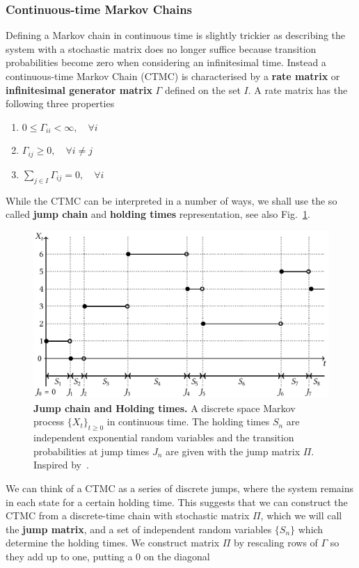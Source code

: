 \subsubsection{Continuous-time Markov Chains}
\label{subsubsect:CTMC}
Defining a Markov chain in continuous time is slightly trickier as describing the system with a stochastic matrix does no longer suffice because transition probabilities become zero when considering an infinitesimal time. Instead a continuous-time Markov Chain (CTMC) is characterised by a \textbf{rate matrix} or \textbf{infinitesimal generator matrix} $\Gamma$ defined on the set $I$. A rate matrix has the following three properties
\begin{enumerate}[label=\roman*)]
	\item $0 \leq \Gamma_{ii} <\infty, \quad \forall i$
	\item $\Gamma_{ij} \geq 0, \quad \forall i \neq j$
	\item $\sum_{j \in I} \Gamma_{i j}=0, \quad \forall i$
\end{enumerate}
While the CTMC can be interpreted in a number of ways, we shall use the so called \textbf{jump chain} and \textbf{holding times} representation, see also Fig.~\ref{fig:holdingJumping}. 
\begin{figure}[h]
	\centering
	\includegraphics[width=0.9\linewidth]{Chapter3/Figs/Vector/ctmc.pdf}
	\caption[Jump chain and Holding times]{\textbf{Jump chain and Holding times.} A discrete space Markov process $\{X_t\}_{t\geq 0}$ in continuous time. The holding times $S_n$ are independent exponential random variables and the transition probabilities at jump times $J_n$ are given with the jump matrix $\Pi$. Inspired by~\cite{norris1998markov}.}
	\label{fig:holdingJumping}
\end{figure}
We can think of a CTMC as a series of discrete jumps, where the system remains in each state for a certain holding time. This suggests that we can construct the CTMC from a discrete-time chain with stochastic matrix $\Pi$, which we will call the \textbf{jump matrix}, and a set of independent random variables $\{S_n\}$ which determine the holding times. We construct matrix $\Pi$ by rescaling rows of $\Gamma$ so they add up to one, putting a $0$ on the diagonal
